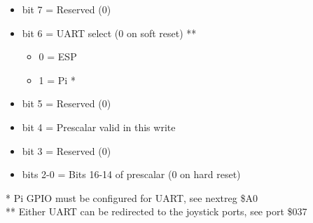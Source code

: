 \begin{itemize}
\item[] bit 7 = Reserved (0)
\item[] bit 6 = UART select (0 on soft reset) **
  \begin{itemize}
  \item[] 0 = ESP
  \item[] 1 = Pi *
  \end{itemize}
\item[] bit 5 = Reserved (0)
\item[] bit 4 = Prescalar valid in this write
\item[] bit 3 = Reserved (0)
\item[] bits 2-0 = Bits 16-14 of prescalar (0 on hard reset)
\end{itemize}
* Pi GPIO must be configured for UART, see nextreg \$A0\\
** Either UART can be redirected to the joystick ports, see port \$037

